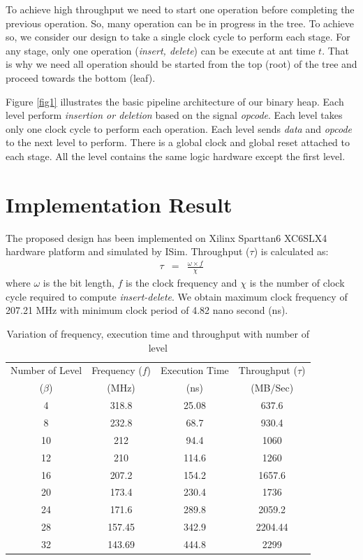 \documentclass[10pt, conference, compsocconf]{IEEEtran}
\begin{document}
To achieve high throughput we need to start one operation before completing the previous operation. So, many operation can be in progress in the tree. To achieve so, we consider our design to take a single clock cycle to perform each stage. For any stage, only one operation ({\it insert, delete}) can be execute at ant time $t$. That is why we need all operation should be started from the top (root) of the tree and proceed towards the bottom (leaf).

Figure \ref{fig1} illustrates the basic pipeline architecture of our binary heap. Each level perform {\it insertion or deletion} based on the signal {\it opcode}. Each level takes only one clock cycle to perform each operation. Each level sends {\it data} and {\it opcode} to the next level to perform. There is a global clock and global reset attached to each stage. All the level contains the same logic hardware except the first level.






\section{Implementation Result}

The proposed design has been implemented on Xilinx Sparttan6  XC6SLX4 hardware platform and simulated by ISim. Throughput ($\tau$) is calculated as:
\begin{eqnarray}
\tau &=&  \frac{\omega \times  f}{\chi}
\end{eqnarray}
 where $\omega$ is the bit length, $f$ is the clock frequency and $\chi$ is the number of clock cycle required to compute {\it insert-delete}. We obtain maximum clock frequency of 207.21 MHz with minimum clock period of 4.82 nano second (ns).



 \begin{table}
 \begin{center}
 \caption{Variation of frequency, execution time and throughput with number of level\label{table1}}
\begin{tabular}{ |c|c|c|c| }
 \hline
 Number of Level  & Frequency ($f$) & Execution Time& Throughput ($\tau$) \\
 ($\beta$) & (MHz)& (ns)& (MB/Sec)\\
 \hline
 \hline
 4 & 318.8 & 25.08 & 637.6\\
 8 & 232.8 & 68.7 & 930.4\\
 10 & 212 & 94.4 & 1060 \\
 12 & 210 & 114.6 & 1260 \\
 16 & 207.2 & 154.2 &1657.6\\
 20 & 173.4 & 230.4 & 1736 \\
 24 & 171.6 & 289.8 & 2059.2\\
 28 & 157.45 & 342.9 & 2204.44\\
 32 & 143.69 & 444.8 & 2299 \\
 \hline
\end{tabular}
\end{center}
\end{table}
\end{document}
